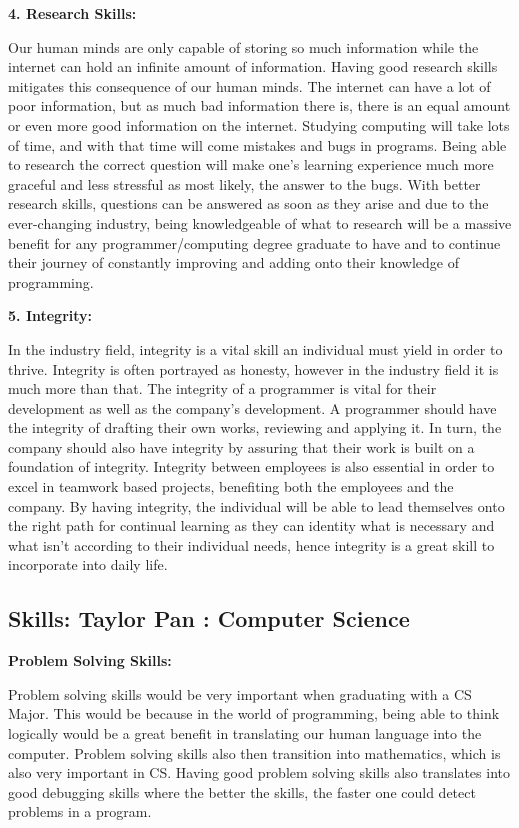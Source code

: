 \documentclass[a4paper, 11pt]{report}
\begin{document}
\textbf{4. Research Skills:}
\par Our human minds are only capable of storing so much information while the internet can hold an infinite amount of information. Having good research skills mitigates this consequence of our human minds. The internet can have a lot of poor information, but as much bad information there is, there is an equal amount or even more good information on the internet. Studying computing will take lots of time, and with that time will come mistakes and bugs in programs. Being able to research the correct question will make one’s learning experience much more graceful and less stressful as most likely, the answer to the bugs. With better research skills, questions can be answered as soon as they arise and due to the ever-changing industry, being knowledgeable of what to research will be a massive benefit for any programmer/computing degree graduate to have and to continue their journey of constantly improving and adding onto their knowledge of programming.

\bigskip

\textbf{5. Integrity:}
\par In the industry field, integrity is a vital skill an individual must yield in order to thrive. Integrity is often portrayed as honesty, however in the industry field it is much more than that. The integrity of a programmer is vital for their development as well as the company's development. A programmer should have the integrity of drafting their own works, reviewing and applying it. In turn, the company should also have integrity by assuring that their work is built on a foundation of integrity. Integrity between employees is also essential in order to excel in teamwork based projects, benefiting both the employees and the company. By having integrity, the individual will be able to lead themselves onto the right path for continual learning as they can identity what is necessary and what isn't according to their individual needs, hence integrity is a great skill to incorporate into daily life.


\subsection{Skills: Taylor Pan : Computer Science}

\indent\indent\textbf{Problem Solving Skills:}
\par Problem solving skills would be very important when graduating with a CS Major. This would be because in the world of programming, being able to think logically would be a great benefit in translating our human language into the computer. Problem solving skills also then transition into mathematics, which is also very important in CS. Having good problem solving skills also translates into good debugging skills where the better the skills, the faster one could detect problems in a program. 
\end{document}
